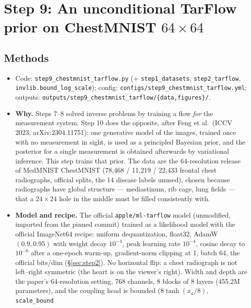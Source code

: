 \documentclass[11pt]{article}
\begin{document}
\section{Step 9: An unconditional TarFlow prior on ChestMNIST $64 \times 64$}
\label{sec:step9}

\subsection{Methods}
\begin{itemize}
  \item Code: \texttt{step9\_chestmnist\_tarflow.py} (+ \texttt{step1\_datasets},
        \texttt{step2\_tarflow}, \texttt{invlib.bound\_log\_scale}); config:
        \texttt{configs/step9\_chestmnist\_tarflow.yml}; outputs:
        \texttt{outputs/step9\_chestmnist\_tarflow/\{data,figures\}/}.
  \item \textbf{Why.} Steps 7--8 solved inverse problems by training a flow
        \emph{for} the measurement system. Step 10 does the opposite, after
        Feng et al.\ (ICCV 2023, arXiv:2304.11751): one generative model of the images,
        trained once with no measurement in sight, is used as a principled
        Bayesian prior, and the posterior for a single measurement is
        obtained afterwards by variational inference. This step trains that
        prior. The data are the 64-resolution release of MedMNIST
        ChestMNIST (78{,}468 / 11{,}219 / 22{,}433 frontal chest radiographs,
        official splits, the 14 disease labels unused), chosen because
        radiographs have global structure --- mediastinum, rib cage, lung
        fields --- that a $24 \times 24$ hole in the middle must be filled
        consistently with.
  \item \textbf{Model and recipe.} The official \texttt{apple/ml-tarflow}
        model (unmodified, imported from the pinned commit) trained as a
        likelihood model with the official ImageNet64 recipe: uniform
        dequantization, float32, AdamW$(0.9, 0.95)$ with weight decay
        $10^{-4}$, peak learning rate $10^{-4}$, cosine decay to $10^{-6}$
        after a one-epoch warm-up, gradient-norm clipping at 1, batch 64,
        the official bits/dim (\S\ref{sec:step2}). No horizontal flip: a
        chest radiograph is not left--right symmetric (the heart is on the
        viewer's right). Width and depth are the paper's 64-resolution
        setting, 768 channels, 8 blocks of 8 layers (455.2M parameters), and
        the coupling head is bounded ($8\tanh(x_a/8)$, \texttt{scale\_bound
}
\end{itemize}
\end{document}
